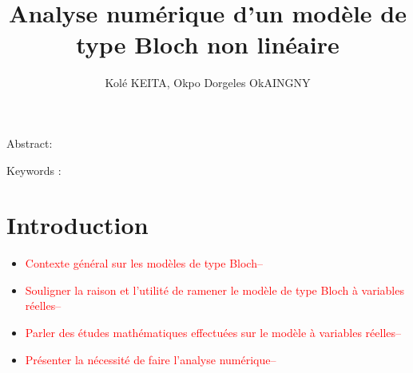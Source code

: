 \documentclass[a4paper]{article}
\title{Analyse numérique d'un modèle de type Bloch non linéaire }
\author{Kolé KEITA, Okpo Dorgeles OkAINGNY}
\begin{document}
\maketitle


Abstract:


\vspace{0.2cm}
\noindent Keywords : 


\section{Introduction}
\begin{itemize}
\item \textcolor{red}{Contexte général sur les modèles de type Bloch--}
\item \textcolor{red}{Souligner la raison et l'utilité de ramener le modèle de type Bloch à variables réelles--}
\item \textcolor{red}{Parler des études mathématiques effectuées sur le modèle à variables réelles--}
\item \textcolor{red}{ Présenter la nécessité de faire l'analyse numérique--}
\end{itemize}
\end{document}
